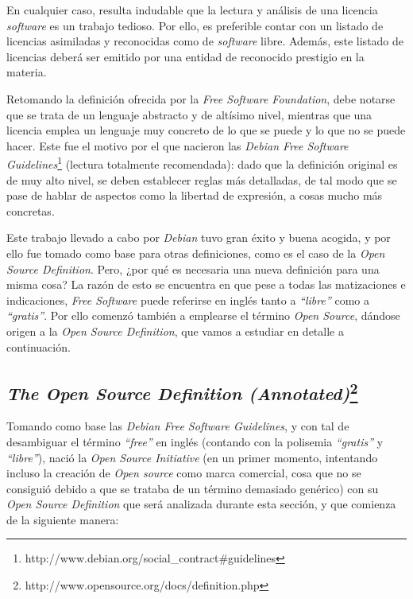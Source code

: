 En cualquier caso, resulta indudable que la lectura y análisis de una licencia
\textit{software} es un trabajo tedioso. Por ello, es preferible contar con un
listado de licencias asimiladas y reconocidas como de \textit{software} libre.
Además, este listado de licencias deberá ser emitido por una entidad de
reconocido prestigio en la materia.

Retomando la definición ofrecida por la \textit{Free Software Foundation}, debe
notarse que se trata de un lenguaje abstracto y de altísimo nivel, mientras que
una licencia emplea un lenguaje muy concreto de lo que se puede y lo que no se
puede hacer. Este fue el motivo por el que nacieron las \textit{Debian Free
Software Guidelines}\footnote{http://www.debian.org/social_contract#guidelines}
(lectura totalmente recomendada): dado que la definición original es de muy alto
nivel, se deben establecer reglas más detalladas, de tal modo que se pase de
hablar de aspectos como la libertad de expresión, a cosas mucho más concretas.

Este trabajo llevado a cabo por \textit{Debian} tuvo gran éxito y buena acogida,
y por ello fue tomado como base para otras definiciones, como es el caso de
la \textit{Open Source Definition}. Pero, ¿por qué es necesaria una nueva
definición para una misma cosa? La razón de esto se encuentra en que pese a
todas las matizaciones e indicaciones, \textit{Free Software} puede referirse en
inglés tanto a \textit{``libre''} como a \textit{``gratis''}. Por ello comenzó
también a emplearse el término \textit{Open Source}, dándose origen a la
\textit{Open Source Definition}, que vamos a estudiar en detalle a continuación.

\subsection{\textit{The Open Source Definition
(Annotated)}\footnote{http://www.opensource.org/docs/definition.php}}

Tomando como base las \textit{Debian Free Software Guidelines}, y con tal de
desambiguar el término \textit{``free''} en inglés (contando con la polisemia
\textit{``gratis''} y \textit{``libre''}), nació la \textit{Open Source
Initiative} (en un primer momento, intentando incluso la creación de
\textit{Open source} como marca comercial, cosa que no se consiguió debido a que
se trataba de un término demasiado genérico) con su \textit{Open Source
Definition} que será analizada durante esta sección, y que comienza de la
siguiente manera:\newline


